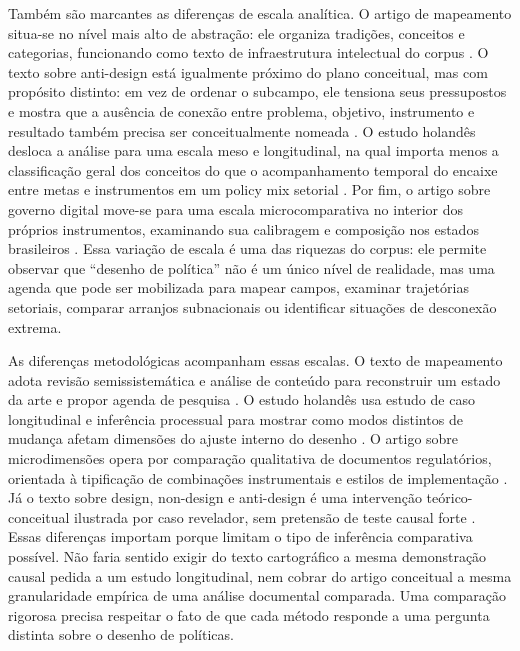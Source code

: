 \documentclass[12pt,a4paper]{article}
\begin{document}
Também são marcantes as diferenças de escala analítica. O artigo de mapeamento situa-se no nível mais alto de abstração: ele organiza tradições, conceitos e categorias, funcionando como texto de infraestrutura intelectual do corpus \parencite{lima2021_conectando_problemas}. O texto sobre anti-design está igualmente próximo do plano conceitual, mas com propósito distinto: em vez de ordenar o subcampo, ele tensiona seus pressupostos e mostra que a ausência de conexão entre problema, objetivo, instrumento e resultado também precisa ser conceitualmente nomeada \parencite{newman2020_policy_design}. O estudo holandês desloca a análise para uma escala meso e longitudinal, na qual importa menos a classificação geral dos conceitos do que o acompanhamento temporal do encaixe entre metas e instrumentos em um policy mix setorial \parencite{geet2019_policy_design}. Por fim, o artigo sobre governo digital move-se para uma escala microcomparativa no interior dos próprios instrumentos, examinando sua calibragem e composição nos estados brasileiros \parencite{lui2026_micro_dimensions}. Essa variação de escala é uma das riquezas do corpus: ele permite observar que “desenho de política” não é um único nível de realidade, mas uma agenda que pode ser mobilizada para mapear campos, examinar trajetórias setoriais, comparar arranjos subnacionais ou identificar situações de desconexão extrema.

As diferenças metodológicas acompanham essas escalas. O texto de mapeamento adota revisão semissistemática e análise de conteúdo para reconstruir um estado da arte e propor agenda de pesquisa \parencite{lima2021_conectando_problemas}. O estudo holandês usa estudo de caso longitudinal e inferência processual para mostrar como modos distintos de mudança afetam dimensões do ajuste interno do desenho \parencite{geet2019_policy_design}. O artigo sobre microdimensões opera por comparação qualitativa de documentos regulatórios, orientada à tipificação de combinações instrumentais e estilos de implementação \parencite{lui2026_micro_dimensions}. Já o texto sobre design, non-design e anti-design é uma intervenção teórico-conceitual ilustrada por caso revelador, sem pretensão de teste causal forte \parencite{newman2020_policy_design}. Essas diferenças importam porque limitam o tipo de inferência comparativa possível. Não faria sentido exigir do texto cartográfico a mesma demonstração causal pedida a um estudo longitudinal, nem cobrar do artigo conceitual a mesma granularidade empírica de uma análise documental comparada. Uma comparação rigorosa precisa respeitar o fato de que cada método responde a uma pergunta distinta sobre o desenho de políticas.
\end{document}
